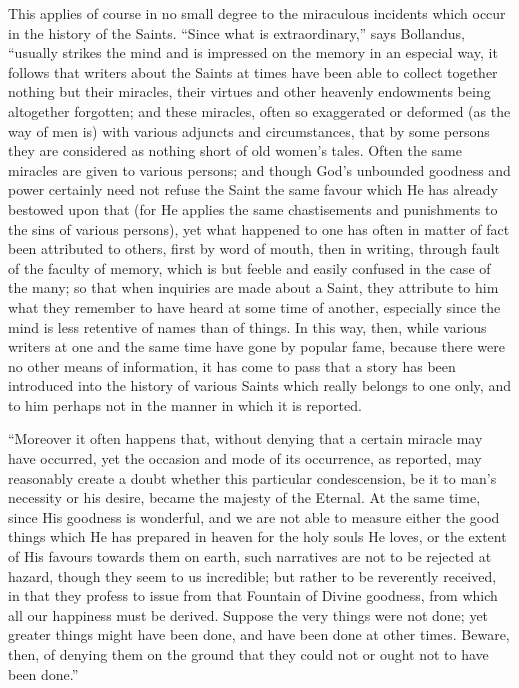 This applies of course in no small degree to the
miraculous incidents which occur in the history of the Saints. ``Since
what is extraordinary,'' says Bollandus, ``usually strikes the mind and
is impressed on the memory in an especial way, it follows that writers
about the Saints at times have been able to collect together nothing
but their miracles, their virtues and other heavenly endowments being
altogether forgotten; and these miracles, often so exaggerated or
deformed (as the way of men is) with various adjuncts and
circumstances, that by some persons they are considered as nothing
short of old women's tales. Often the same miracles are given to
various persons; and though God's unbounded goodness and power
certainly need not refuse the Saint the same favour which He has
already bestowed upon that (for He applies the same chastisements and
punishments to the sins of various persons), yet what happened to
one has often in matter of fact been attributed to others, first by
word of mouth, then in writing, through fault of the faculty of
memory, which is but feeble and easily confused in the case of the
many; so that when inquiries are made about a Saint, they attribute to
him what they remember to have heard at some time of another,
especially since the mind is less retentive of names than of things.
In this way, then, while various writers at one and the same time have
gone by popular fame, because there were no other means of
information, it has come to pass that a story has been introduced into
the history of various Saints which really belongs to one only, and to
him perhaps not in the manner in which it is reported.

``Moreover it often happens that, without denying
that a certain miracle may have occurred, yet the occasion and mode of
its occurrence, as reported, may reasonably create a doubt whether
this particular condescension, be it to man's necessity or his desire,
became the majesty of the Eternal. At the same time, since His
goodness is wonderful, and we are not able to measure either the good
things which He has prepared in heaven for the holy souls He loves, or
the extent of His favours towards them on earth, such narratives are
not to be rejected at hazard, though they seem to us incredible; but
rather to be reverently received, in that they profess to issue from
that Fountain of Divine goodness, from which all our happiness must be
derived. Suppose the very things were not done; yet greater things
might have been done, and have been done at other times. Beware,
then, of denying them on the ground that they could not or ought not
to have been done.''

